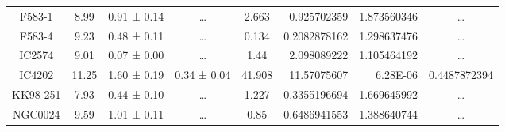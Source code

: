 \documentclass[reprint,%
 amsmath,amssymb,
 aps,
]{revtex4-1}
\begin{document}
\begin{table}[]
\begin{tabular}{cccccrrc}
\rowcolor[HTML]{F3F3F3} 
F583-1               & 8.99                      & 0.91 ± 0.14           & …                      & 2.663                                                        & 0.925702359                                                           & 1.873560346                                                           & …                                                             \\
\rowcolor[HTML]{F3F3F3} 
F583-4               & 9.23                      & 0.48 ± 0.11           & …                      & 0.134                                                        & 0.2082878162                                                          & 1.298637476                                                           & …                                                             \\
\rowcolor[HTML]{F3F3F3} 
IC2574               & 9.01                      & 0.07 ± 0.00           & …                      & 1.44                                                         & 2.098089222                                                           & 1.105464192                                                           & …                                                             \\
\rowcolor[HTML]{F3F3F3} 
IC4202               & 11.25                     & 1.60 ± 0.19           & 0.34 ± 0.04            & 41.908                                                       & 11.57075607                                                           & 6.28E-06                                                              & \multicolumn{1}{r}{\cellcolor[HTML]{F3F3F3}0.4487872394}      \\
\rowcolor[HTML]{F3F3F3} 
KK98-251             & 7.93                      & 0.44 ± 0.10           & …                      & 1.227                                                        & 0.3355196694                                                          & 1.669645992                                                           & …                                                             \\
\rowcolor[HTML]{F3F3F3} 
NGC0024              & 9.59                      & 1.01 ± 0.11           & …                      & 0.85                                                         & 0.6486941553                                                          & 1.388640744                                                           & …                                                             \\

\end{tabular}
\end{table}
\end{document}
